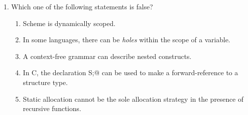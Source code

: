\documentclass[12pt]{article}
\begin{document}
\begin{enumerate}
\newpage

\item Which one of the following statements is false?

\begin{enumerate}

\item Scheme is dynamically scoped.

\item In some languages, there can be \textit{holes} within the scope
  of a variable.

\item A context-free grammar can describe nested constructs.

\item In C, the declaration \verb@struct S;@ can be used to make a
  forward-reference to a structure type.

\item Static allocation cannot be the sole allocation strategy in
  the presence of recursive functions.

\end{enumerate}

\end{enumerate}
\end{document}
